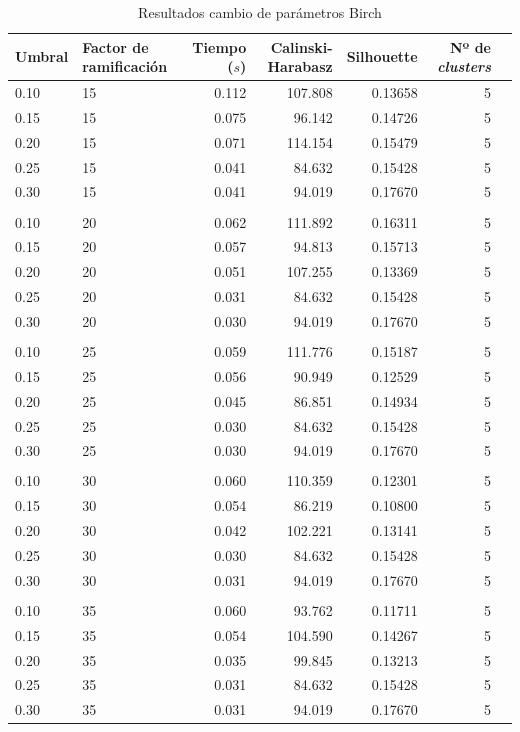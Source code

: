 \documentclass[a4paper, 20pt]{article}
\begin{document}
\begin{table}[H]
\centering
\caption{Resultados cambio de parámetros Birch}
\label{tab:param_birch3}
\begin{tabular}{llrrrrr}
\toprule
 Umbral & Factor de ramificación & Tiempo ($s$) & Calinski-Harabasz & Silhouette & Nº de \textit{clusters} \\
\midrule
0.10 & 15 & 0.112 & 107.808 & 0.13658 & 5 \\
0.15 & 15 & 0.075 & 96.142 & 0.14726 & 5 \\
0.20 & 15 & 0.071 & 114.154 & 0.15479 & 5 \\
0.25 & 15 & 0.041 & 84.632 & 0.15428 & 5 \\
0.30 & 15 & 0.041 & 94.019 & 0.17670 & 5 \\
\\
0.10 & 20 & 0.062 & 111.892 & 0.16311 & 5 \\
0.15 & 20 & 0.057 & 94.813 & 0.15713 & 5 \\
0.20 & 20 & 0.051 & 107.255 & 0.13369 & 5 \\
0.25 & 20 & 0.031 & 84.632 & 0.15428 & 5 \\
0.30 & 20 & 0.030 & 94.019 & 0.17670 & 5 \\
\\
0.10 & 25 & 0.059 & 111.776 & 0.15187 & 5 \\
0.15 & 25 & 0.056 & 90.949 & 0.12529 & 5 \\
0.20 & 25 & 0.045 & 86.851 & 0.14934 & 5 \\
0.25 & 25 & 0.030 & 84.632 & 0.15428 & 5 \\
0.30 & 25 & 0.030 & 94.019 & 0.17670 & 5 \\
\\
0.10 & 30 & 0.060 & 110.359 & 0.12301 & 5 \\
0.15 & 30 & 0.054 & 86.219 & 0.10800 & 5 \\
0.20 & 30 & 0.042 & 102.221 & 0.13141 & 5 \\
0.25 & 30 & 0.030 & 84.632 & 0.15428 & 5 \\
0.30 & 30 & 0.031 & 94.019 & 0.17670 & 5 \\
\\
0.10 & 35 & 0.060 & 93.762 & 0.11711 & 5 \\
0.15 & 35 & 0.054 & 104.590 & 0.14267 & 5 \\
0.20 & 35 & 0.035 & 99.845 & 0.13213 & 5 \\
0.25 & 35 & 0.031 & 84.632 & 0.15428 & 5 \\
0.30 & 35 & 0.031 & 94.019 & 0.17670 & 5 \\
\bottomrule
\end{tabular}
\end{table}
\end{document}
